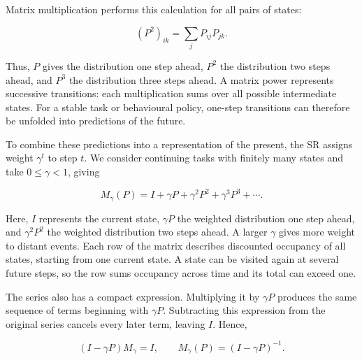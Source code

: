 \documentclass[11pt,a4paper]{article}
\begin{document}
\par
\noindent\begin{minipage}{\linewidth}

Matrix multiplication performs this calculation for all pairs of states:

\[
(P^2)_{ik}=\sum_jP_{ij}P_{jk}.
\]

\end{minipage}\par

Thus, \(P\) gives the distribution one step ahead, \(P^2\) the
distribution two steps ahead, and \(P^3\) the distribution three steps
ahead. A matrix power represents successive transitions: each
multiplication sums over all possible intermediate states. For a stable
task or behavioural policy, one-step transitions can therefore be
unfolded into predictions of the future.

\par
\noindent\begin{minipage}{\linewidth}

To combine these predictions into a representation of the present, the
SR assigns weight \(\gamma^t\) to step \(t\). We consider continuing
tasks with finitely many states and take \(0\leq\gamma<1\), giving

\[
M_\gamma(P)=I+\gamma P+\gamma^2P^2+\gamma^3P^3+\cdots.
\]

\end{minipage}\par

Here, \(I\) represents the current state, \(\gamma P\) the weighted
distribution one step ahead, and \(\gamma^2P^2\) the weighted
distribution two steps ahead. A larger \(\gamma\) gives more weight to
distant events. Each row of the matrix describes discounted occupancy of
all states, starting from one current state. A state can be visited
again at several future steps, so the row sums occupancy across time and
its total can exceed one.

\par
\noindent\begin{minipage}{\linewidth}

The series also has a compact expression. Multiplying it by \(\gamma P\)
produces the same sequence of terms beginning with \(\gamma P\).
Subtracting this expression from the original series cancels every later
term, leaving \(I\). Hence,

\[
(I-\gamma P)M_\gamma=I,
\qquad
M_\gamma(P)=(I-\gamma P)^{-1}.
\]

\end{minipage}\par
\end{document}
